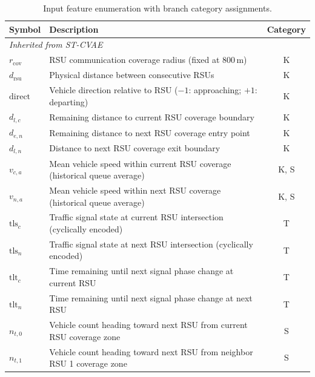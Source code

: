 \documentclass[journal]{IEEEtran}
\begin{document}
\begin{table}[!t]
  \renewcommand{\arraystretch}{1.1}
  \caption{Input feature enumeration with branch category assignments.}
  \label{tab:features}
  \centering
  \begin{tabular}{@{}lp{5.0cm}c@{}}
    \toprule
    \textbf{Symbol} & \textbf{Description} & \textbf{Category} \\
    \midrule
    \multicolumn{3}{l}{\textit{Inherited from ST-CVAE}} \\
    $r_{\text{cov}}$          & RSU communication coverage radius (fixed at 800\,m)                         & K \\
    $d_{\text{rsu}}$          & Physical distance between consecutive RSUs                                   & K \\
    $\text{direct}$           & Vehicle direction relative to RSU ($-1$: approaching; $+1$: departing)      & K \\
    $d_{l,c}$                 & Remaining distance to current RSU coverage boundary                          & K \\
    $d_{e,n}$                 & Remaining distance to next RSU coverage entry point                          & K \\
    $d_{l,n}$                 & Distance to next RSU coverage exit boundary                                  & K \\
    $v_{c,a}$                 & Mean vehicle speed within current RSU coverage (historical queue average)    & K, S \\
    $v_{n,a}$                 & Mean vehicle speed within next RSU coverage (historical queue average)       & K, S \\
    $\text{tls}_{c}$          & Traffic signal state at current RSU intersection (cyclically encoded)        & T \\
    $\text{tls}_{n}$          & Traffic signal state at next RSU intersection (cyclically encoded)           & T \\
    $\text{tlt}_{c}$          & Time remaining until next signal phase change at current RSU                 & T \\
    $\text{tlt}_{n}$          & Time remaining until next signal phase change at next RSU                    & T \\
    $n_{t,0}$                 & Vehicle count heading toward next RSU from current RSU coverage zone         & S \\
    $n_{t,1}$                 & Vehicle count heading toward next RSU from neighbor RSU 1 coverage zone      & S \\

\end{tabular}
\end{table}
\end{document}
